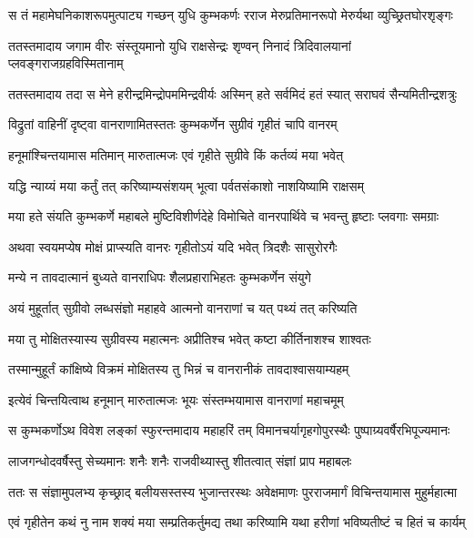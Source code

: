 \twolineshloka
{स तं महामेघनिकाशरूपमुत्पाट्य गच्छन् युधि कुम्भकर्णः}
{रराज मेरुप्रतिमानरूपो मेरुर्यथा व्युच्छ्रितघोरशृङ्गः} %

\twolineshloka
{ततस्तमादाय जगाम वीरः संस्तूयमानो युधि राक्षसेन्द्रः}
{शृण्वन् निनादं त्रिदिवालयानां प्लवङ्गराजग्रहविस्मितानाम्} %

\twolineshloka
{ततस्तमादाय तदा स मेने हरीन्द्रमिन्द्रोपममिन्द्रवीर्यः}
{अस्मिन् हते सर्वमिदं हतं स्यात् सराघवं सैन्यमितीन्द्रशत्रुः} %

\twolineshloka
{विद्रुतां वाहिनीं दृष्ट्वा वानराणामितस्ततः}
{कुम्भकर्णेन सुग्रीवं गृहीतं चापि वानरम्} %

\twolineshloka
{हनूमांश्चिन्तयामास मतिमान् मारुतात्मजः}
{एवं गृहीते सुग्रीवे किं कर्तव्यं मया भवेत्} %

\twolineshloka
{यद्धि न्याय्यं मया कर्तुं तत् करिष्याम्यसंशयम्}
{भूत्वा पर्वतसंकाशो नाशयिष्यामि राक्षसम्} %

\twolineshloka
{मया हते संयति कुम्भकर्णे महाबले मुष्टिविशीर्णदेहे}
{विमोचिते वानरपार्थिवे च भवन्तु हृष्टाः प्लवगाः समग्राः} %

\twolineshloka
{अथवा स्वयमप्येष मोक्षं प्राप्स्यति वानरः}
{गृहीतोऽयं यदि भवेत् त्रिदशैः सासुरोरगैः} %

\twolineshloka
{मन्ये न तावदात्मानं बुध्यते वानराधिपः}
{शैलप्रहाराभिहतः कुम्भकर्णेन संयुगे} %

\twolineshloka
{अयं मुहूर्तात् सुग्रीवो लब्धसंज्ञो महाहवे}
{आत्मनो वानराणां च यत् पथ्यं तत् करिष्यति} %

\twolineshloka
{मया तु मोक्षितस्यास्य सुग्रीवस्य महात्मनः}
{अप्रीतिश्च भवेत् कष्टा कीर्तिनाशश्च शाश्वतः} %

\twolineshloka
{तस्मान्मुहूर्तं कांक्षिष्ये विक्रमं मोक्षितस्य तु}
{भिन्नं च वानरानीकं तावदाश्वासयाम्यहम्} %

\twolineshloka
{इत्येवं चिन्तयित्वाथ हनूमान् मारुतात्मजः}
{भूयः संस्तम्भयामास वानराणां महाचमूम्} %

\twolineshloka
{स कुम्भकर्णोऽथ विवेश लङ्कां स्फुरन्तमादाय महाहरिं तम्}
{विमानचर्यागृहगोपुरस्थैः पुष्पाग्र्यवर्षैरभिपूज्यमानः} %

\twolineshloka
{लाजगन्धोदवर्षैस्तु सेच्यमानः शनैः शनैः}
{राजवीथ्यास्तु शीतत्वात् संज्ञां प्राप महाबलः} %

\twolineshloka
{ततः स संज्ञामुपलभ्य कृच्छ्राद् बलीयसस्तस्य भुजान्तरस्थः}
{अवेक्षमाणः पुरराजमार्गं विचिन्तयामास मुहुर्महात्मा} %

\twolineshloka
{एवं गृहीतेन कथं नु नाम शक्यं मया सम्प्रतिकर्तुमद्य}
{तथा करिष्यामि यथा हरीणां भविष्यतीष्टं च हितं च कार्यम्} %


